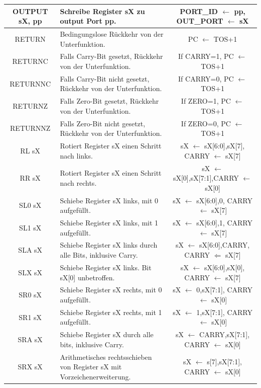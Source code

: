\documentclass{scrartcl}
\begin{document}
\begin{longtable}{||c|p{4cm}|c||}
         OUTPUT sX, pp & Schreibe Register sX zu output Port pp. &PORT\_ID $\leftarrow$ pp, OUT\_PORT $\leftarrow$ sX  \\ \hline
         RETURN & Bedingungslose Rückkehr von der Unterfunktion. & PC $\leftarrow$ TOS+1  \\ \hline
         RETURNC & Falls Carry-Bit gesetzt, Rückkehr von der Unterfunktion. & If CARRY=1, PC $\leftarrow$ TOS+1 \\ \hline
         RETURNNC & Falls Carry-Bit nicht gesetzt, Rückkehr von der Unterfunktion. & If CARRY=0, PC $\leftarrow$ TOS+1 \\ \hline
         RETURNZ & Falls Zero-Bit gesetzt, Rückkehr von der Unterfunktion.& If ZERO=1, PC $\leftarrow$ TOS+1 \\ \hline
         RETURNNZ & Falls Zero-Bit nicht gesetzt, Rückkehr von der Unterfunktion. & If ZERO=0, PC $\leftarrow$ TOS+1  \\ \hline
         RL sX & Rotiert Register sX einen Schritt nach links. &sX $\leftarrow$ {sX[6:0],sX[7]}, CARRY $\leftarrow$ sX[7]  \\ \hline
         RR sX & Rotiert Register sX einen Schritt nach rechts. &sX $\leftarrow$ {sX[0],sX[7:1]},CARRY $\leftarrow$ sX[0]   \\ \hline
         SL0 sX & Schiebe Register sX links, mit 0 aufgefüllt. &sX $\leftarrow$ {sX[6:0],0}, CARRY $\leftarrow$ sX[7]  \\ \hline
         SL1 sX & Schiebe Register sX links, mit 1 aufgefüllt. &sX $\leftarrow$ {sX[6:0],1}, CARRY $\leftarrow$ sX[7]  \\ \hline
         SLA sX & Schiebe Register sX links durch alle Bits, inklusive Carry. &sX $\leftarrow$ {sX[6:0],CARRY}, CARRY $\Leftarrow$ sX[7]  \\ \hline
         SLX sX & Schiebe Register sX links. Bit sX[0] unbetroffen. &sX $\leftarrow$ {sX[6:0],sX[0]}, CARRY $\leftarrow$ sX[7]  \\ \hline
         SR0 sX & Schiebe Register sX rechts, mit 0 aufgefüllt. &sX $\leftarrow$ {0,sX[7:1]}, CARRY $\leftarrow$ sX[0]  \\ \hline
         SR1 sX & Schiebe Register sX rechts, mit 1 aufgefüllt. &sX $\leftarrow$ {1,sX[7:1]}, CARRY $\leftarrow$ sX[0]  \\ \hline
         SRA sX & Schiebe Register sX durch alle bits, inklusive Carry. &sX $\leftarrow$ {CARRY,sX[7:1]}, CARRY $\leftarrow$ sX[0]  \\ \hline
         SRX sX & Arithmetisches rechtsschieben von Register sX mit Vorzeichenerweiterung. &sX $\leftarrow$ {s[7],sX[7:1]}, CARRY $\leftarrow$ sX[0]  \\ \hline

\end{longtable}
\end{document}
